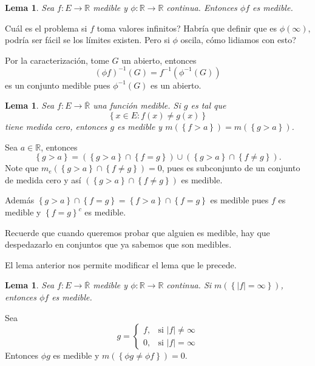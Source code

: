 \documentclass[12pt]{article}
\theoremstyle{plain}
\newtheorem{Lem}[Th]{Lema}             %
\theoremstyle{definition}
\theoremstyle{remark}
\numberwithin{equation}{section}
\newcommand{\bR}{\mathbb{R}}        %
\renewcommand{\:}{\colon}           %
\newcommand{\conj}[1]{\left\lbrace#1\right\rbrace}
\begin{document}
\begin{multicols}{2}
\begin{Lem}
  Sea $f\: E\to\bR$ medible y $\phi\:\bR\to\bR$ continua. Entonces $\phi f$ es medible.
\end{Lem}

Cuál es el problema si $f$ toma valores infinitos? Habría que definir que es $\phi(\infty)$, podría ser fácil se los límites existen. Pero si $\phi$ oscila, cómo lidiamos con esto?

\begin{ptcbp}
Por la caracterización, tome $G$ un abierto, entonces
$$(\phi f)^{-1}(G)=f^{-1}(\phi^{-1}(G))$$
es un conjunto medible pues $\phi^{-1}(G)$ es un abierto.
\end{ptcbp}

\begin{Lem}
  Sea $f\:E\to\overline{\bR}$ una función medible. Si $g$ es tal que
  $$\conj{x\in E\: f(x)\neq g(x)}$$
  tiene medida cero, entonces $g$ es medible y $m(\conj{f>a})=m(\conj{g>a})$.
\end{Lem}

\begin{ptcbp}
Sea $a\in\bR$, entonces
$$\conj{g>a}=\left(\conj{g>a}\cap\conj{f=g}\right)\cup \left(\conj{g>a}\cap\conj{f\neq g}\right).$$
Note que $m_e \left(\conj{g>a}\cap\conj{f\neq g}\right)=0$, pues es subconjunto de un conjunto de medida cero y así $ \left(\conj{g>a}\cap\conj{f\neq g}\right)$ es medible.\par
Además $\conj{g>a}\cap\conj{f=g}=\conj{f>a}\cap\conj{f=g}$ es medible pues $f$ es medible y $\conj{f=g}^c$ es medible.
\end{ptcbp}

Recuerde que cuando queremos probar que alguien es medible, hay que despedazarlo en conjuntos que ya sabemos que son medibles.\par
El lema anterior nos permite modificar el lema que le precede.

\begin{Lem}
  Sea $f\: E\to\overline{\bR}$ medible y $\phi\:\bR\to\bR$ continua. Si $m(\conj{|f|=\infty})$, entonces $\phi f$ es medible.
\end{Lem}

\begin{ptcbp}
Sea
$$g=\begin{cases}
      f, & \mbox{si } |f|\neq\infty \\
      0, & \mbox{si } |f|=\infty
    \end{cases}$$
    Entonces $\phi g$ es medible y $m(\conj{\phi g\neq \phi f})=0$.
\end{ptcbp}


\end{multicols}
\end{document}
